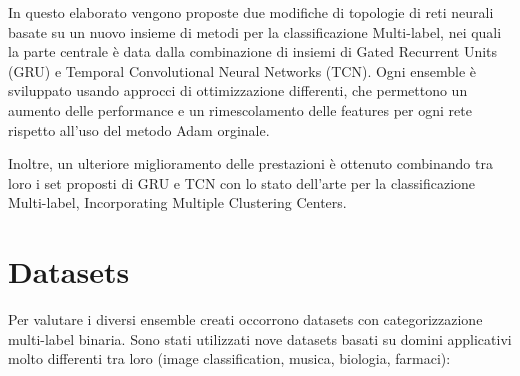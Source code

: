 In questo elaborato vengono proposte due modifiche di topologie di reti neurali basate su un nuovo insieme di metodi per la classificazione Multi-label, nei quali la parte centrale è data dalla combinazione di insiemi di Gated Recurrent Units (GRU) e Temporal Convolutional Neural Networks (TCN). Ogni ensemble è sviluppato usando approcci di ottimizzazione differenti, che permettono un aumento delle performance e un rimescolamento delle features per ogni rete rispetto all'uso del metodo Adam orginale. 

Inoltre, un ulteriore miglioramento delle prestazioni è ottenuto combinando tra loro i set proposti di GRU e TCN con lo stato dell'arte per la classificazione Multi-label, Incorporating Multiple Clustering Centers.

\section{Datasets}
Per valutare i diversi ensemble creati occorrono datasets con categorizzazione multi-label binaria. Sono stati utilizzati nove datasets basati su domini applicativi molto differenti tra loro (image classification, musica, biologia, farmaci):

